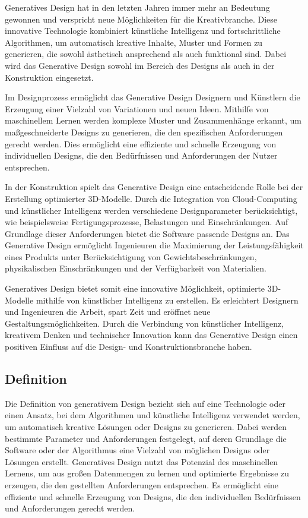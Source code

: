 Generatives Design hat in den letzten Jahren immer mehr an Bedeutung gewonnen und verspricht neue Möglichkeiten für die Kreativbranche. Diese innovative Technologie kombiniert künstliche Intelligenz und fortschrittliche Algorithmen, um automatisch kreative Inhalte, Muster und Formen zu generieren, die sowohl ästhetisch ansprechend als auch funktional sind. Dabei wird das Generative Design sowohl im Bereich des Designs als auch in der Konstruktion eingesetzt.

Im Designprozess ermöglicht das Generative Design Designern und Künstlern die Erzeugung einer Vielzahl von Variationen und neuen Ideen. Mithilfe von maschinellem Lernen werden komplexe Muster und Zusammenhänge erkannt, um maßgeschneiderte Designs zu generieren, die den spezifischen Anforderungen gerecht werden. Dies ermöglicht eine effiziente und schnelle Erzeugung von individuellen Designs, die den Bedürfnissen und Anforderungen der Nutzer entsprechen.

In der Konstruktion spielt das Generative Design eine entscheidende Rolle bei der Erstellung optimierter 3D-Modelle. Durch die Integration von Cloud-Computing und künstlicher Intelligenz werden verschiedene Designparameter berücksichtigt, wie beispielsweise Fertigungsprozesse, Belastungen und Einschränkungen. Auf Grundlage dieser Anforderungen bietet die Software passende Designs an. Das Generative Design ermöglicht Ingenieuren die Maximierung der Leistungsfähigkeit eines Produkts unter Berücksichtigung von Gewichtsbeschränkungen, physikalischen Einschränkungen und der Verfügbarkeit von Materialien.

Generatives Design bietet somit eine innovative Möglichkeit, optimierte 3D-Modelle mithilfe von künstlicher Intelligenz zu erstellen. Es erleichtert Designern und Ingenieuren die Arbeit, spart Zeit und eröffnet neue Gestaltungsmöglichkeiten. Durch die Verbindung von künstlicher Intelligenz, kreativem Denken und technischer Innovation kann das Generative Design einen positiven Einfluss auf die Design- und Konstruktionsbranche haben.

\subsection*{Definition}
Die Definition von generativem Design bezieht sich auf eine Technologie oder einen Ansatz, bei dem Algorithmen und künstliche Intelligenz verwendet werden, um automatisch kreative Lösungen oder Designs zu generieren. Dabei werden bestimmte Parameter und Anforderungen festgelegt, auf deren Grundlage die Software oder der Algorithmus eine Vielzahl von möglichen Designs oder Lösungen erstellt. Generatives Design nutzt das Potenzial des maschinellen Lernens, um aus großen Datenmengen zu lernen und optimierte Ergebnisse zu erzeugen, die den gestellten Anforderungen entsprechen. Es ermöglicht eine effiziente und schnelle Erzeugung von Designs, die den individuellen Bedürfnissen und Anforderungen gerecht werden.

